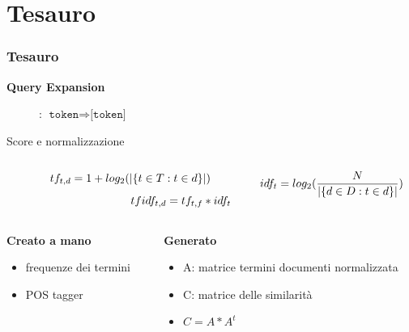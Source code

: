 \documentclass{beamer}
\begin{document}
\section{Tesauro}
\begin{frame}
	\frametitle{Tesauro}

		\begin{description}
			\item[\textbf{Query Expansion}]: $\texttt{token} \Rightarrow \texttt{[token]}$	
		\end{description}
		\begin{block}{Score e normalizzazione}
		\vspace{-1em}
		\begin{columns}[T]
			\begin{column}{0.5\textwidth}
				\begin{equation*}
					\hspace*{1em}tf_{t,d} = 1 + log_2(|\{t \in T: t \in d\}|)
				\end{equation*}	
				\begin{equation*}
					\hspace{10em}tf\-idf_{t,d} = tf_{t,f} * idf_{t}
				\end{equation*}
			\end{column}
			\begin{column}{0.5\textwidth}
				\begin{equation*}
					\hspace*{-1em}idf_t = log_2(\frac{N}{|\{d \in D: t \in d\}|})
				\end{equation*}
			\end{column}
		\end{columns}
	\end{block}
	\vspace{1em}

	\begin{columns}[T]
		\begin{column}{0.5\textwidth}
			\textbf{Creato a mano}
			\begin{itemize}
				\item frequenze dei termini
				\item POS tagger
			\end{itemize}
		\end{column}
		\begin{column}{0.5\textwidth}
			\textbf{Generato}
			\begin{itemize}
				\item A: matrice termini documenti normalizzata
				\item C: matrice delle similarità
				\item $C = A * A^t$
			\end{itemize}
		\end{column}
	\end{columns}


\end{frame}
\end{document}
